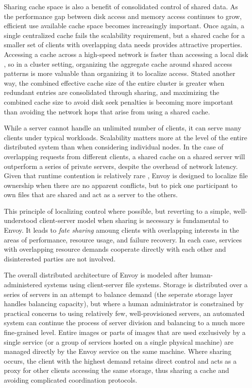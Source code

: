Sharing cache space is also a benefit of consolidated control of shared data. As the performance gap between disk access and memory access continues to grow, efficient use available cache space becomes increasingly important. Once again, a single centralized cache fails the scalability requirement, but a shared cache for a smaller set of clients with overlapping data needs provides attractive properties. Accessing a cache across a high-speed network is faster than accessing a local disk \cite{dahlin94b}, so in a cluster setting, organizing the aggregate cache around shared access patterns is more valuable than organizing it to localize access. Stated another way, the combined effective cache size of the entire cluster is greater when redundant entries are consolidated through sharing, and maximizing the combined cache size to avoid disk seek penalties is becoming more important than avoiding the network hops that arise from using a shared cache.

While a server cannot handle an unlimited number of clients, it can serve many clients under typical workloads. Scalability matters more at the level of the entire distributed system than when considering individual nodes. In the case of overlapping requests from different clients, a shared cache on a shared server will outperform a series of private servers, despite the overhead of network latency. Given that runtime contention is relatively rare \cite{kistler}, Envoy is designed to localize file ownership when there are no apparent conflicts, but to pick one participant to own files that are shared and act as a server to the others.

This principle of localizing control where possible, but reverting to a simple, well-understood client-server model when sharing is necessary is fundamental to Envoy. It leads to \emph{fate sharing} amoung clients with overlapping interests in the areas of performance, resource usage, and failure recovery. In each case, services with overlapping resource demands cooperate directly with each other and disinterested parties are not involved.

The overall distributed architecture of Envoy is modeled after human-administered systems using client-server file systems. Storage is distributed over a series of servers in an attempt to balance demand (the seperate storage layer handles balancing capacity), but where a human administrator is constrained by practical concerns to using relatively few, well-provisioned servers, an automated system can continue the process of server division and balancing to a much more fine-grained level. Entire images or parts of images that are used exclusively by a single service (or a group of services hosted on a single physical machine) are managed directly by the Envoy service on the same machine. Where sharing occurs, the client with the highest demand retains direct control and acts as a proxy for other clients accessing the same storage, thus sharing a cache and avoiding complicated coordination protocols.

